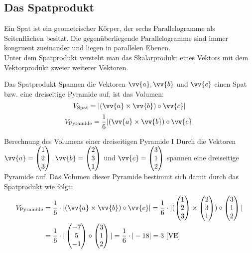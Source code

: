 \subsection{Das Spatprodukt}
Ein Spat ist ein geometrischer Körper, der sechs Parallelogramme als Seitenflächen besitzt. Die gegenüberliegende Parallelogramme sind immer kongruent zueinander und liegen in parallelen Ebenen.\\
Unter dem Spatprodukt versteht man das Skalarprodukt eines Vektors mit dem Vektorprodukt zweier weiterer Vektoren.
\begin{defi}{Das Spatprodukt}{}
Spannen die Vektoren $\vv{a}, \vv{b}$ und $\vv{c}$ einen Spat bzw. eine dreiseitige Pyramide auf, ist das Volumen:
$$V_{\text{Spat}} = |(\vv{a}\times\vv{b})\circ \vv{c}|$$ $$V_{\text{Pyramide}}=\dfrac{1}{6}|(\vv{a}\times\vv{b})\circ \vv{c}| $$
\end{defi} 
\begin{bsp}{Berechnung des Volumens einer dreiseitigen Pyramide I}{}
Durch die Vektoren $\vv{a} = \begin{pmatrix} 1\\2\\3
\end{pmatrix}, \vv{b}= \begin{pmatrix}
    2\\3\\1
\end{pmatrix}$ und $\vv{c}= \begin{pmatrix}
   3\\1\\2
\end{pmatrix}$ spannen eine dreiseitige Pyramide auf. Das Volumen dieser Pyramide bestimmt sich damit durch das Spatprodukt wie folgt:
\begin{equation*}
    \begin{split}
      V_{\text{Pyramide}} &= \dfrac{1}{6} \cdot |(\vv{a}\times \vv{b})\circ \vv{c}| = \dfrac{1}{6} \cdot |(\begin{pmatrix}1\\2\\3\end{pmatrix} \times 
\begin{pmatrix} 2\\3\\1 \end{pmatrix}) \circ 
\begin{pmatrix} 3\\1\\2 \end{pmatrix}|\\
&=\dfrac{1}{6} \cdot |\begin{pmatrix} -7\\5\\-1 \end{pmatrix}\circ \begin{pmatrix} 3\\1\\2 \end{pmatrix}|  =\dfrac{1}{6} \cdot |-18| = 3\ \text{[VE]}
    \end{split}
\end{equation*}
\end{bsp}
